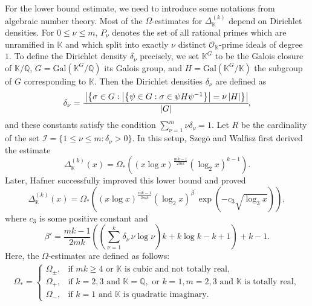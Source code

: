 \documentclass[reqno]{amsart}
\numberwithin{equation}{section}
\theoremstyle{plain}
\begin{document}
For the lower bound estimate, we need to introduce some notations from algebraic number theory. Most of the $\Omega$-estimates for $ \Delta_{\mathbb{K}}^{(k)}$ depend on Dirichlet densities.
 For $0\leq \nu \leq m$, $P_{\nu}$ denotes the set of all rational primes which are unramified in $\mathbb{K}$  and which split into exactly $\nu$ distinct $\mathcal{O}_{\mathbb{K}}$-prime ideals of degree $1$. To define the Dirichlet density $\delta_{\nu}$ precisely, we set 
$\mathbb{K}^{G}$ to be the Galois closure of $\mathbb{K}/\mathbb{Q}$, $G=\text{Gal}\left(\mathbb{K}^G/\mathbb{Q}\right)$ its Galois group, and $H= \text{Gal}\left(\mathbb{K}^G/\mathbb{K}\right)$ the subgroup of $G$ corresponding to $\mathbb{K}$. Then the Dirichlet densities $\delta_{\nu}$ are defined as
\begin{equation} \label{Def of Density}
	\delta_{\nu}= \cfrac{\left| \left\{ \sigma\in G: \left| \left\{\psi \in G: \sigma \in \psi H\psi^{-1}\right\}\right| = \nu \left|H\right|\right\} \right|}{\left|G\right| },
\end{equation}
	and these constants satisfy the condition $\sum_{\nu=1}^m \nu \delta_{\nu}=1$. Let $R$ be the cardinality of the set $\mathcal{I} = \{1\leq \nu \leq m: \delta_{\nu}>0\}$. 
	In this setup, Szeg\"o{} and Walfisz \cite{Szego-Walfisz, Szego-Walfisz (2)} first derived the estimate 
	\begin{equation*}
		\Delta_{\mathbb{K}}^{(k)}(x) = \Omega_{*}\left((x\log x)^{\frac{mk-1}{2mk}}(\log_2 x)^{k-1}\right).
	\end{equation*}
	Later, Hafner \cite{Halfner(2)} successfully improved this lower bound and proved 
	\begin{equation*}
		\Delta_{\mathbb{K}}^{(k)}(x) = \Omega_{*}\left( (x\log x)^{\frac{mk-1}{2mk}} (\log_2 x)^{\beta^{'}} \exp(-c_3\sqrt{\log_3x})\right),
	\end{equation*}
	where $c_3$ is some positive constant and 
	\begin{equation*}
		\beta' = \frac{mk-1}{2mk} \left( \left(\sum_{\nu=1}^{k}\delta_{\nu}\, \nu \log \nu\right)k +k\log k -k +1\right)+k -1.
	\end{equation*}
	Here, the $\Omega$-estimates are defined as follows:
\begin{align*}
	\Omega_{*} = 
	\begin{cases}
		\Omega_{\pm}, & \text{if } mk \geq 4 \text{ or } \mathbb{K} \text{ is cubic and not totally real}, \\
		\Omega_{+}, & \text{if } k = 2,3 \text{ and } \mathbb{K} = \mathbb{Q}, \text{ or } k = 1, m = 2,3 \text{ and } \mathbb{K} \text{ is totally real},\\
		\Omega_{-}, & \text{if } k = 1 \text{ and } \mathbb{K} \text{ is quadratic imaginary}.
	\end{cases}
\end{align*}
\end{document}
